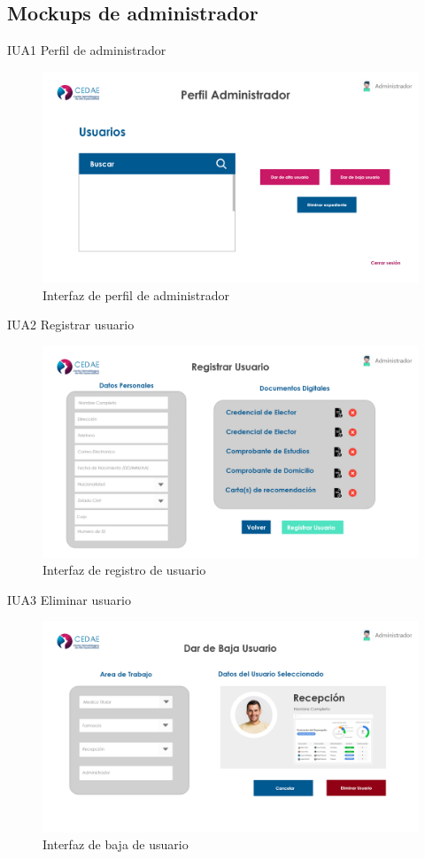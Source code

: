 \documentclass[12pt,letterpaper]{article}
\begin{document}
        \subsection{Mockups de administrador}
        IUA1 Perfil de administrador
            \begin{figure}[H]
                \centering
                \includegraphics [scale=0.2]{interfaces/adm_perfil}
                \caption{Interfaz de perfil de administrador}
            \end{figure}
        IUA2 Registrar usuario
            \begin{figure}[H]
                \centering
                \includegraphics [scale=0.2]{interfaces/adm_reg_usuario}
                \caption{Interfaz de registro de usuario}
            \end{figure}
        IUA3 Eliminar usuario
            \begin{figure}[H]
                \centering
                \includegraphics [scale=0.2]{interfaces/adm_baja_usuario}
                \caption{Interfaz de baja de usuario}
            \end{figure}
\end{document}
